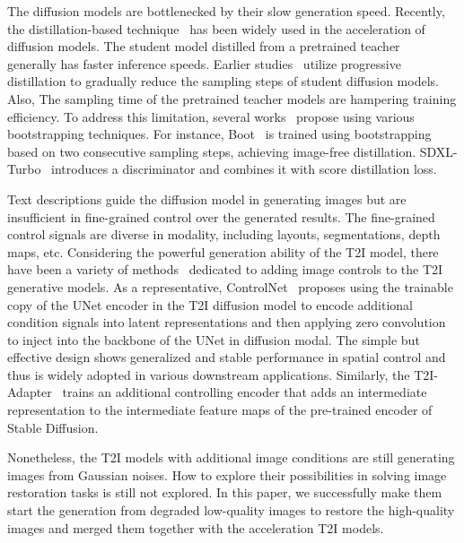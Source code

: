 \vspace{-1mm}
The diffusion models are bottlenecked by their slow generation speed.
Recently, the distillation-based technique~\citep{hinton2014distilling} has been widely used in the acceleration of diffusion models.
The student model distilled from a pretrained teacher~\citep{luo2023LCM,sauer2023adversarial} generally has faster inference speeds. 
Earlier studies~\citep{salimans2022progressive,meng2023distillation} utilize progressive distillation to gradually reduce the sampling steps of student diffusion models.
Also, The sampling time of the pretrained teacher models are hampering training efficiency.
To address this limitation, several works~\citep{gu2023boot,nguyen2023swiftbrush} 
propose using various bootstrapping techniques.
For instance, Boot~\citep{gu2023boot} is trained using bootstrapping based on two consecutive sampling steps, achieving image-free distillation. SDXL-Turbo~\citep{sauer2023adversarial} introduces a discriminator and combines it with score distillation loss. 

\vspace{-1mm}
Text descriptions guide the diffusion model in generating images but are insufficient in fine-grained control over the generated results. The fine-grained control signals are diverse in modality, including layouts, segmentations, depth maps, etc.
Considering the powerful generation ability of the T2I model, there have been a variety of methods~\citep{li2024controlnet_plus,zavadski2023controlnet_xs,lin2024ctrl_adapter} dedicated to adding image controls to the T2I generative models.
As a representative, ControlNet~\citep{zhang2023controlnet} proposes using the trainable copy of the UNet encoder in the T2I diffusion model to encode additional condition signals into latent representations and then applying zero convolution to inject into the backbone of the UNet in diffusion modal. The simple but effective design shows generalized and stable performance in spatial control and thus is widely adopted in various downstream applications. 
Similarly, the T2I-Adapter~\citep{mou2024t2i_adapter} trains an additional controlling encoder that adds an intermediate representation to the intermediate feature maps of the pre-trained encoder of Stable Diffusion. 

Nonetheless, the T2I models with additional image conditions are still generating images from Gaussian noises. How to explore their possibilities in solving image restoration tasks is still not explored. In this paper, we successfully make them start the generation from degraded low-quality images to restore the high-quality images and merged them together with the acceleration T2I models.